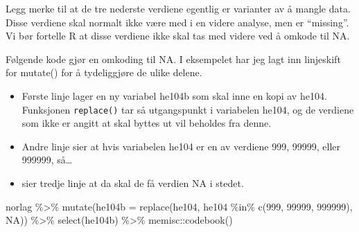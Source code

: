 \documentclass[
  letterpaper,
  DIV=11,
  numbers=noendperiod]{scrreprt}
\newenvironment{Shaded}{\begin{snugshade}}{\end{snugshade}}
\newcommand{\AttributeTok}[1]{\textcolor[rgb]{0.40,0.45,0.13}{#1}}
\newcommand{\ConstantTok}[1]{\textcolor[rgb]{0.56,0.35,0.01}{#1}}
\newcommand{\DecValTok}[1]{\textcolor[rgb]{0.68,0.00,0.00}{#1}}
\newcommand{\FunctionTok}[1]{\textcolor[rgb]{0.28,0.35,0.67}{#1}}
\newcommand{\NormalTok}[1]{\textcolor[rgb]{0.00,0.23,0.31}{#1}}
\newcommand{\SpecialCharTok}[1]{\textcolor[rgb]{0.37,0.37,0.37}{#1}}
\providecommand{\tightlist}{%
  \setlength{\itemsep}{0pt}\setlength{\parskip}{0pt}}\usepackage{longtable,booktabs,array}
\begin{document}
Legg merke til at de tre nederste verdiene egentlig er varianter av å
mangle data. Disse verdiene skal normalt ikke være med i en videre
analyse, men er ``missing''. Vi bør fortelle R at disse verdiene ikke
skal tas med videre ved å omkode til NA.

Følgende kode gjør en omkoding til NA. I eksempelet har jeg lagt inn
linjeskift for mutate() for å tydeliggjøre de ulike delene.

\begin{itemize}
\tightlist
\item
  Første linje lager en ny variabel he104b som skal inne en kopi av
  he104. Funksjonen \texttt{replace()} tar så utgangspunkt i variabelen
  he104, og de verdiene som ikke er angitt at skal byttes ut vil
  beholdes fra denne.\\
\item
  Andre linje sier at hvis variabelen he104 er en av verdiene 999,
  99999, eller 999999, så\ldots{}
\item
  sier tredje linje at da skal de få verdien NA i stedet.
\end{itemize}

\begin{Shaded}
\begin{Highlighting}[]
\NormalTok{norlag }\SpecialCharTok{\%\textgreater{}\%} 
  \FunctionTok{mutate}\NormalTok{(}\AttributeTok{he104b =} \FunctionTok{replace}\NormalTok{(he104, }
\NormalTok{                         he104 }\SpecialCharTok{\%in\%} \FunctionTok{c}\NormalTok{(}\DecValTok{999}\NormalTok{, }\DecValTok{99999}\NormalTok{, }\DecValTok{999999}\NormalTok{), }
                         \ConstantTok{NA}\NormalTok{)) }\SpecialCharTok{\%\textgreater{}\%}  
    \FunctionTok{select}\NormalTok{(he104b) }\SpecialCharTok{\%\textgreater{}\%} 
\NormalTok{  memisc}\SpecialCharTok{::}\FunctionTok{codebook}\NormalTok{()}
\end{Highlighting}
\end{Shaded}
\end{document}
